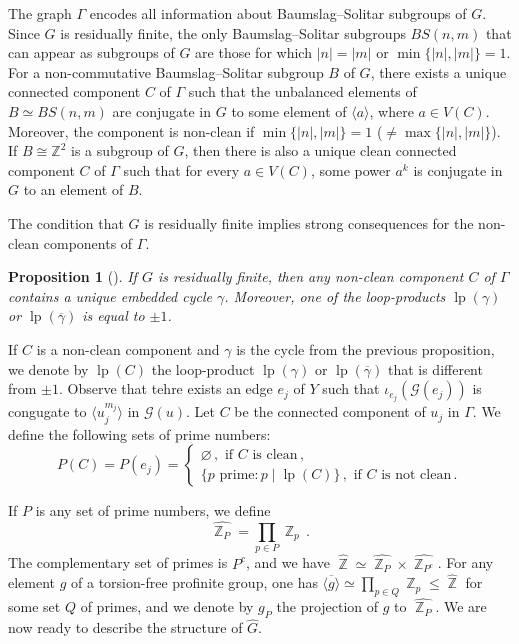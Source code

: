 \documentclass[a4paper]{amsart}
\newtheorem{pro}[lem]{Proposition}
\theoremstyle{definition}
\theoremstyle{remark}
\DeclareMathOperator{\bbz}{\mathbb{Z}}
\newcommand{\G}{\mathcal G}
\begin{document}
The graph \(\Gamma\) encodes all information about Baumslag--Solitar subgroups of \(G\). Since \(G\) is residually finite, the only Baumslag--Solitar subgroups \(BS(n,m)\) that can appear as subgroups of \(G\) are those for which \(|n| = |m|\) or \(\min\{|n|, |m|\} = 1\). For a non-commutative Baumslag--Solitar subgroup \(B\) of \(G\), there exists a unique connected component \(C\) of \(\Gamma\) such that the unbalanced elements of \(B \simeq BS(n,m)\) are conjugate in \(G\) to some element of \(\langle a \rangle\), where \(a \in V(C)\). Moreover, 
the component is non-clean if  $\min\{|n|, |m|\} = 1 $ ($\ne \max\{|n|, |m|\}$). If \(B \cong \mathbb{Z}^2\) is a subgroup of \(G\), then there is also a unique clean connected component \(C\) of \(\Gamma\) such that for every \(a \in V(C)\), some power \(a^k\) is conjugate in \(G\) to an element of \(B\).


The condition that \(G\) is residually finite implies strong consequences for the non-clean components of \( \Gamma \).

\begin{pro}[{\cite[Prop.~4.9]{AM24}}]\label{eulre0} If \(G\) is residually finite, then any non-clean component \(C\) of \(\Gamma\) contains a unique embedded cycle \(\gamma\). Moreover, one of the loop-products \(\operatorname{lp}(\gamma)\) or \(\operatorname{lp}(\overline{\gamma})\) is equal to \( \pm 1 \).
\end{pro}

If \(C\) is a non-clean component and \(\gamma\) is the cycle from the previous proposition, we denote by \(\operatorname{lp}(C)\) the loop-product \(\operatorname{lp}(\gamma)\) or \(\operatorname{lp}(\overline{\gamma})\) that is different from \(\pm 1\). Observe that tehre exists an edge \(e_j\)   of \(Y\) such that \(\iota_{e_j}(\G(e_j)) \) is congugate to \(  \langle u_j^{m_j} \rangle\) in $\G(u)$. 
Let \(C\) be the connected component of \(u_j\) in \(\Gamma\). We define the following sets of prime numbers:
\[P(C) = P(e_j) = \begin{cases}
    \varnothing\,,\text{ if }C\text{ is clean}\,,\\
    \{p \text{ prime}\colon p \mid \operatorname{lp}(C)\}\,,\text{ if }C \text{ is not clean}\,.
\end{cases}\]

If \(P\) is any set of prime numbers, we define \[\widehat{\bbz_P} = \prod_{p \in P} \bbz_p\,.\] The complementary set of primes is \(P^c\), and we have \(\widehat{\bbz} \simeq \widehat{\bbz_P} \times \widehat{\bbz_{P^c}}\). For any element \(g\) of a torsion-free profinite group, one has \(\overline{\langle g \rangle} \simeq \prod_{p \in Q} \bbz_p \leq \widehat{\bbz}\) for some set \(Q\) of primes, and we denote by \(g_P\) the projection of \(g\) to \(\widehat{\bbz_P}\). We are now ready to describe the structure of \(\widehat{G}\).
\end{document}
